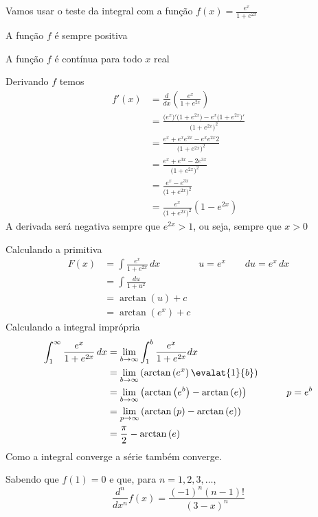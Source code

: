 \documentclass[a4paper,12pt,fleqn]{article}
\begin{document}
\begin{answer}
  Vamos usar o teste da integral com a função \(f(x) = \frac{e^x}{1+e^{2x}}\)

  A função $f$ é sempre positiva

  A função $f$ é contínua para todo $x$ real

  Derivando $f$ temos
  \begin{align*}
    f'(x)
    & = \frac{d}{dx} \left(\frac{e^x}{1+e^{2x}}\right) \\
    & = \frac{\big(e^x\big)'\big(1+e^{2x}\big) - e^x\big(1+e^{2x}\big)'}{\big(1+e^{2x}\big)^2} \\
    & = \frac{e^x+e^xe^{2x} - e^xe^{2x}2}{\big(1+e^{2x}\big)^2} \\
    & = \frac{e^x +e^{3x} - 2e^{3x}}{\big(1+e^{2x}\big)^2} \\
    & = \frac{e^x - e^{3x}}{\big(1+e^{2x}\big)^2} \\
    & = \frac{e^x}{\big(1+e^{2x}\big)^2}\left(1 - e^{2x}\right)
  \end{align*}
  A derivada será negativa sempre que \(e^{2x}>1\), ou seja, sempre que \(x>0\)

  Calculando a primitiva
  \begin{align*}
    F(x)
    & = \int \frac{e^x}{1+e^{2x}} \, dx \qquad\qquad u = e^x \qquad du = e^x\,dx \\
    & = \int \frac{du}{1+u^2} \\
    & = \arctan\left(u\right) + c \\
    & = \arctan\left(e^x\right) + c
  \end{align*}
  Calculando a integral imprópria
  \begin{align*}
    \int_1^\infty \frac{e^x}{1+e^{2x}} \,dx
    & = \lim_{b\to\infty} \int_1^b \frac{e^x}{1+e^{2x}} dx \\
    & = \lim_{b\to\infty} \left(\arctan\left(e^x\right) \evalat{1}{b}\right) \\
    & = \lim_{b\to\infty} \left(\arctan\left(e^b\right) - \arctan\left(e\right)\right)
    \qquad\qquad p = e^b \\
    & = \lim_{p\to\infty} \left(\arctan\left(p\right) - \arctan\left(e\right)\right) \\
    & = \frac{\pi}{2} - \arctan\left(e\right)
  \end{align*}
  Como a integral converge a série também converge.
\end{answer}

Sabendo que \(f(1)=0\) e que, para \(n=1, 2, 3, \dots\),
\[
  \frac{d^n}{dx^n}f(x) = \frac{(-1)^n(n-1)!}{(3-x)^n}
\]
\end{document}
